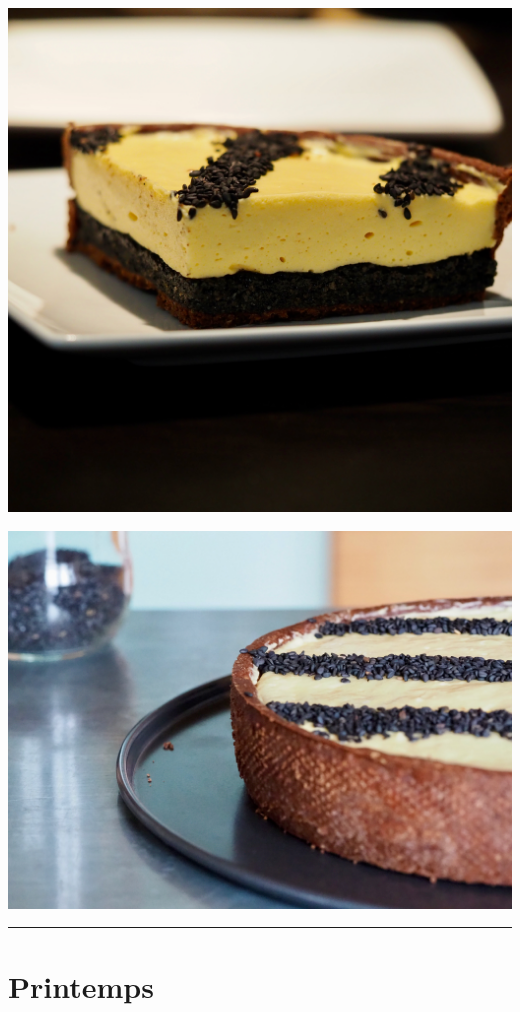 \documentclass[]{book}
\begin{document}
\begin{center}\includegraphics[width=0.9\linewidth]{photos/pralinesesame_passion2} \end{center}

\begin{center}\includegraphics[width=0.9\linewidth]{photos/pralinesesame_passion3} \end{center}

\begin{center}\rule{0.5\linewidth}{0.5pt}\end{center}

\chapter*{Printemps}\label{printemps}
\end{document}
